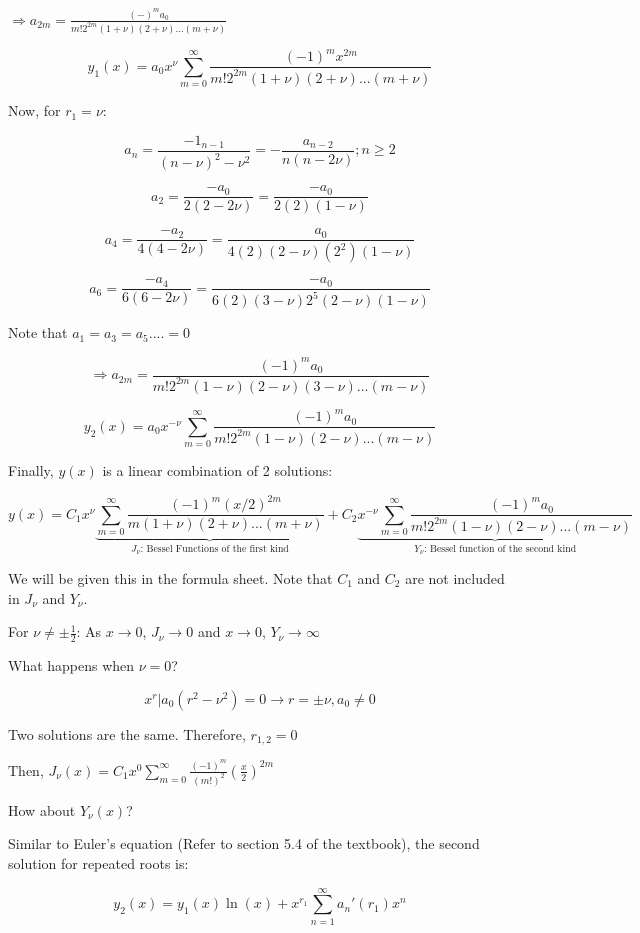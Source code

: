\documentclass{article}
\begin{document}
$\Rightarrow a_{2m} = \frac{(-)^m a_0}{m! 2^{2m} (1 + \nu) (2 + \nu) ... (m + \nu)}$

$$y_1(x) = a_0 x^{\nu} \sum_{m = 0}^\infty \frac{(-1)^m x^{2m}}{m! 2^{2m} (1 + \nu)(2 + \nu) ... (m + \nu)}$$

Now, for $r_1 = \nu$:

$$a_n = \frac{-1_{n-1}}{(n - \nu)^2 - \nu^2} = -\frac{a_{n-2}}{n(n - 2 \nu)}; n \geq 2$$

$$a_2 = \frac{-a_0}{2(2-2\nu)} = \frac{-a_0}{2(2)(1-\nu)}$$

$$a_4 = \frac{-a_2}{4(4-2\nu)} = \frac{a_0}{4(2)(2-\nu)(2^2)(1 - \nu)}$$

$$a_6 = \frac{-a_4}{6(6 - 2 \nu)} = \frac{-a_0}{6(2)(3-\nu)2^5 (2 - \nu) (1 - \nu)}$$

Note that $a_1 = a_3 = a_5 .... = 0$

$$\Rightarrow a_{2m} = \frac{(-1)^m a_0}{m! 2^{2m} (1-\nu)(2 - \nu) (3 - \nu) ... (m - \nu)}$$

$$ y_2(x) = a_0 x^{-\nu} \sum_{m = 0}^\infty \frac{(-1)^m a_0}{m! 2^{2m} (1-\nu)(2 - \nu) ... (m - \nu)}$$

Finally, $y(x)$ is a linear combination of 2 solutions:

$$y(x) = C_1 x^{\nu} \underbrace{\sum_{m = 0}^\infty \frac{(-1)^m (x/2)^{2m}}{m (1 + \nu)(2 + \nu) ... (m + \nu)}}_{J_\nu \text{: Bessel Functions of the first kind}} + C_2 \underbrace{x^{-\nu} \sum_{m = 0}^\infty \frac{(-1)^m a_0}{m! 2^{2m} (1-\nu)(2 - \nu) ... (m - \nu)}}_{Y_\nu \text{: Bessel function of the second kind}}$$

We will be given this in the formula sheet. Note that $C_1$ and $C_2$ are not included in $J_\nu$ and $Y_\nu$.

For $\nu \neq \pm \frac{1}{2}$: As $x \to  0$, $J_\nu \to 0$ and $x \to  0$, $Y_\nu \to \infty$

What happens when $\nu = 0$?

$$x^r | a_0 (r^2 - \nu^2) = 0 \rightarrow r = \pm \nu, a_0 \neq 0$$

Two solutions are the same. Therefore, $r_{1,2} = 0$


Then, $J_\nu(x) = C_1 x^0 \sum_{m = 0}^\infty \frac{(-1)^m}{(m!)^2} \left(\frac{x}{2} \right)^{2m}$

How about $Y_\nu (x)$?

Similar to Euler's equation (Refer to section 5.4 of the textbook), the second solution for repeated roots is:

$$y_2 (x) = y_1(x) \ln(x) + x^{r_1} \sum_{n = 1}^\infty a_n ' (r_1) x^n$$
\end{document}
